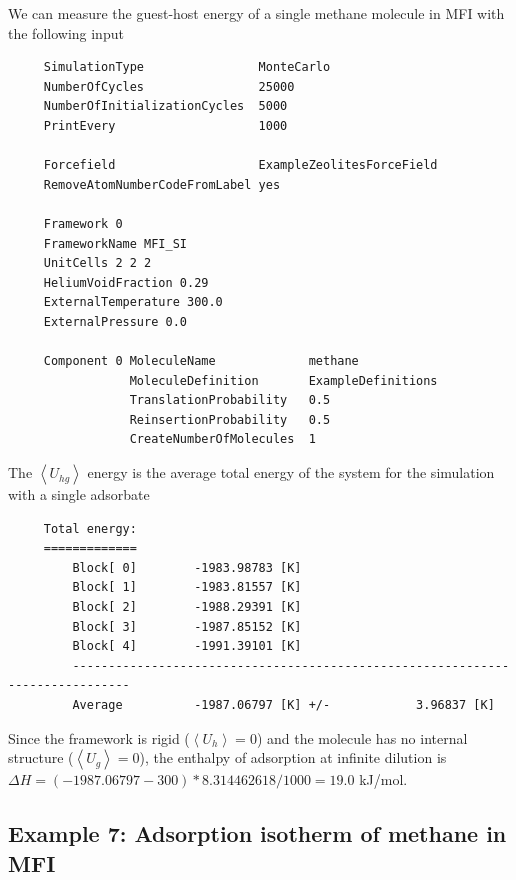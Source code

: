 \noindent
We can measure the guest-host energy of a single methane molecule in MFI with the following input
\begin{tiny}
\begin{verbatim}
     SimulationType                MonteCarlo
     NumberOfCycles                25000
     NumberOfInitializationCycles  5000
     PrintEvery                    1000
     
     Forcefield                    ExampleZeolitesForceField
     RemoveAtomNumberCodeFromLabel yes
     
     Framework 0
     FrameworkName MFI_SI
     UnitCells 2 2 2
     HeliumVoidFraction 0.29
     ExternalTemperature 300.0
     ExternalPressure 0.0
     
     Component 0 MoleculeName             methane
                 MoleculeDefinition       ExampleDefinitions
                 TranslationProbability   0.5
                 ReinsertionProbability   0.5
                 CreateNumberOfMolecules  1
\end{verbatim}
\end{tiny}

\noindent
The $\left\langle U_{hg}\right\rangle$ energy is the average total energy of the system for the simulation with a single adsorbate
\begin{tiny}
\begin{verbatim}
     Total energy:
     =============
         Block[ 0]        -1983.98783 [K]
         Block[ 1]        -1983.81557 [K]
         Block[ 2]        -1988.29391 [K]
         Block[ 3]        -1987.85152 [K]
         Block[ 4]        -1991.39101 [K]
         ------------------------------------------------------------------------------
         Average          -1987.06797 [K] +/-            3.96837 [K]
\end{verbatim}
\end{tiny}
Since the framework is rigid ($\left\langle U_{h}\right\rangle=0$) and the molecule has no internal structure
($\left\langle U_{g}\right\rangle=0$), the enthalpy of adsorption at infinite dilution is
$\Delta H = (-1987.06797-300)*8.314462618/1000=19.0$ kJ/mol.


\subsection*{Example 7: Adsorption isotherm of methane in MFI}

